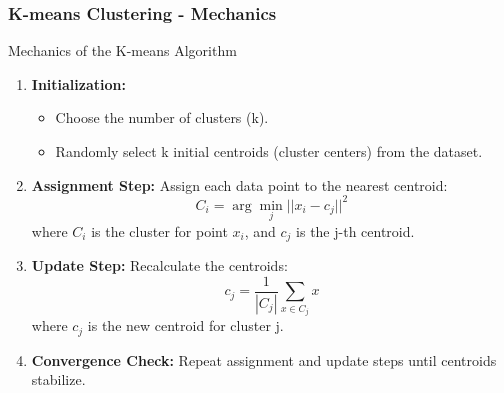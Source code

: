 \documentclass[aspectratio=169]{beamer}
\begin{document}
\begin{frame}[fragile]
    \frametitle{K-means Clustering - Mechanics}
    \begin{block}{Mechanics of the K-means Algorithm}
        \begin{enumerate}
            \item \textbf{Initialization:}
            \begin{itemize}
                \item Choose the number of clusters (k).
                \item Randomly select k initial centroids (cluster centers) from the dataset.
            \end{itemize}
            
            \item \textbf{Assignment Step:}
            Assign each data point to the nearest centroid:
            \begin{equation}
                C_i = \arg\min_{j} || x_i - c_j ||^2
            \end{equation}
            where \( C_i \) is the cluster for point \( x_i \), and \( c_j \) is the j-th centroid.

            \item \textbf{Update Step:}
            Recalculate the centroids:
            \begin{equation}
                c_j = \frac{1}{|C_j|} \sum_{x \in C_j} x
            \end{equation}
            where \( c_j \) is the new centroid for cluster j.

            \item \textbf{Convergence Check:} 
            Repeat assignment and update steps until centroids stabilize.
        \end{enumerate}
    \end{block}
\end{frame}
\end{document}

